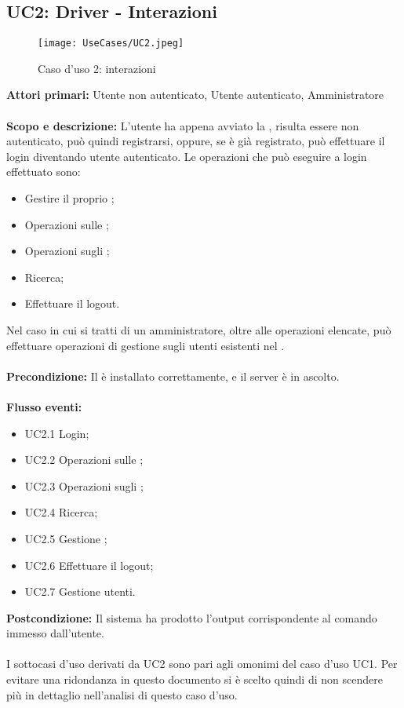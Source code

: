 \documentclass{scalatekids-article}
\begin{document}
\subsection{UC2: Driver - Interazioni}
\begin{figure}[H]
  \begin{center}
    \texttt{[image: UseCases/UC2.jpeg]}
    \caption{Caso d'uso 2:  interazioni}
  \end{center}
\end{figure}
\textbf{Attori primari:} Utente non autenticato, Utente autenticato, Amministratore\\ \\
\textbf{Scopo e descrizione:}
L’utente ha appena avviato la , risulta essere non autenticato, può quindi
registrarsi, oppure, se è già registrato, può effettuare il login diventando utente
autenticato. Le operazioni che può eseguire a login effettuato sono:
\begin{itemize}
\item Gestire il proprio ;
\item Operazioni sulle ;
\item Operazioni sugli ;
\item Ricerca;
\item Effettuare il logout.
\end{itemize}
Nel caso in cui si tratti di un amministratore, oltre alle operazioni elencate, può effettuare operazioni di gestione sugli utenti
esistenti nel .\\ \\
\textbf{Precondizione:} Il  è installato correttamente, e il server è in ascolto.\\ \\
\textbf{Flusso eventi:}
\begin{itemize}
\item UC2.1 Login;
\item UC2.2 Operazioni sulle ;
\item UC2.3 Operazioni sugli ;
\item UC2.4 Ricerca;
\item UC2.5 Gestione ;
\item UC2.6 Effettuare il logout;
\item UC2.7 Gestione utenti.
\end{itemize}
\textbf{Postcondizione:} Il sistema ha prodotto l'output corrispondente al
comando immesso dall'utente.\\ \\ I sottocasi d'uso derivati da UC2 sono pari
agli omonimi del caso d'uso UC1. Per evitare una ridondanza in questo documento
si è scelto quindi di non scendere più in dettaglio nell'analisi di questo caso
d'uso.
\end{document}
